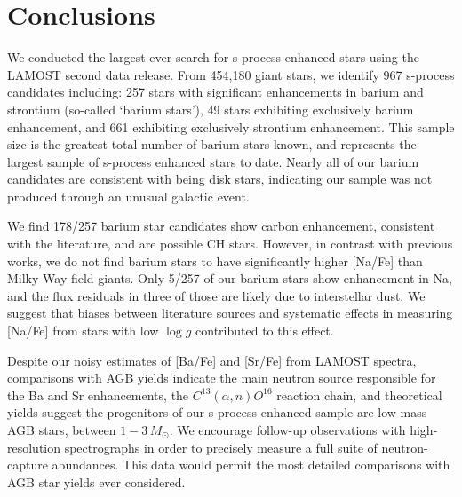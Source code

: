 \documentclass[a4paper,fleqn,usenatbib]{mnras}
\begin{document}
\section{Conclusions} \label{sec:con}

We conducted the largest ever search for s-process enhanced stars using the LAMOST second data release. From 454,180 giant stars, we identify 967 s-process candidates including: 257 stars with significant enhancements in barium and strontium (so-called `barium stars'), 49 stars exhibiting exclusively barium enhancement, and 661 exhibiting exclusively strontium enhancement. This sample size is the greatest total number of barium stars known, and represents the largest sample of s-process enhanced stars to date. Nearly all of our barium candidates are consistent with being disk stars, indicating our sample was not produced through an unusual galactic event. 

We find 178/257 barium star candidates show carbon enhancement, consistent with the literature, and are possible CH stars. However, in contrast with previous works, we do not find barium stars to have significantly higher [Na/Fe] than Milky Way field giants. Only 5/257 of our barium stars show enhancement in Na, and the flux residuals in three of those are likely due to interstellar dust. We suggest that biases between literature sources and systematic effects in measuring [Na/Fe] from stars with low $\log{g}$ contributed to this effect. 

Despite our noisy estimates of [Ba/Fe] and [Sr/Fe] from LAMOST spectra, comparisons with AGB yields indicate the main neutron source responsible for the Ba and Sr enhancements, the $C^{13}(\alpha,n)O^{16}$ reaction chain, and theoretical yields suggest the progenitors of our s-process enhanced sample are low-mass AGB stars, between $1 - 3\,M_{\odot}$. We encourage follow-up observations with high-resolution spectrographs in order to precisely measure a full suite of neutron-capture abundances. This data would permit the most detailed comparisons with AGB star yields ever considered.

 
\end{document}
